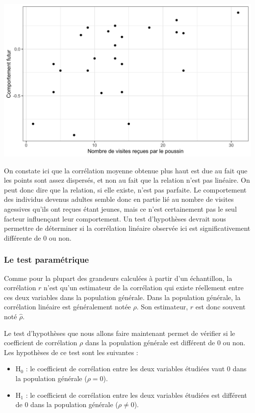 \documentclass[
  a4paper,
]{article}
\providecommand{\tightlist}{%
  \setlength{\itemsep}{0pt}\setlength{\parskip}{0pt}}
\begin{document}
\begin{center}\includegraphics[width=0.9\linewidth]{figure/unnamed-chunk-104-1} \end{center}

On constate ici que la corrélation moyenne obtenue plus haut est due au fait que les points sont assez dispersés, et non au fait que la relation n'est pas linéaire. On peut donc dire que la relation, si elle existe, n'est pas parfaite. Le comportement des individus devenus adultes semble donc en partie lié au nombre de visites agessives qu'ils ont reçues étant jeunes, mais ce n'est certainement pas le seul facteur influençant leur comportement. Un test d'hypothèses devrait nous permettre de déterminer si la corrélation linéaire observée ici est significativement différente de 0 ou non.

\hypertarget{le-test-paramuxe9trique-4}{%
\subsubsection{Le test paramétrique}\label{le-test-paramuxe9trique-4}}

Comme pour la plupart des grandeurs calculées à partir d'un échantillon, la corrélation \(r\) n'est qu'un estimateur de la corrélation qui existe réellement entre ces deux variables dans la population générale. Dans la population générale, la corrélation linéaire est généralement notée \(\rho\). Son estimateur, \(r\) est donc souvent noté \(\hat{\rho}\).

Le test d'hypothèses que nous allons faire maintenant permet de vérifier si le coefficient de corrélation \(\rho\) dans la population générale est différent de 0 ou non. Les hypothèses de ce test sont les suivantes :

\begin{itemize}
\tightlist
\item
  H\(_0\) : le coefficient de corrélation entre les deux variables étudiées vaut 0 dans la population générale (\(\rho = 0\)).
\item
  H\(_1\) : le coefficient de corrélation entre les deux variables étudiées est différent de 0 dans la population générale (\(\rho \neq 0\)).
\end{itemize}
\end{document}
